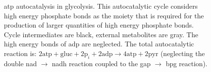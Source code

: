 \documentclass[a4page,notitlepage]{article}
\begin{document}

\begin{figure}
    \centering{

}
\caption{
 atp autocatalysis in glycolysis.
 This autocatalytic cycle considers high energy phosphate bonds as the moiety that is required for the production of larger quantities of high energy phosphate bonds.
 Cycle intermediates are black, external metabolites are gray.
 The high energy bonds of adp are neglected.
 The total autocatalytic reaction is: $2\text{atp}+\text{gluc}+2\text{p}_i+2\text{adp}\rightarrow 4\text{atp}+2\text{pyr}$ (neglecting the double nad $\rightarrow$ nadh reaction coupled to the gap $\rightarrow$ bpg reaction).
 }
\end{figure}
\end{document}
